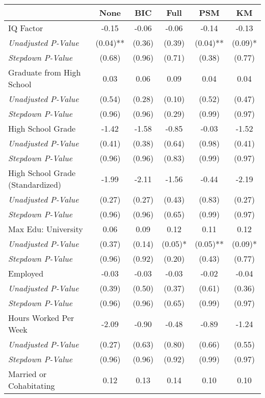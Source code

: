 \begin{tabular}{l c c c c c}
\toprule
 & None & BIC & Full & PSM & KM \\
\midrule
IQ Factor & -0.15 & -0.06 & -0.06 & -0.14 & -0.13 \\
\quad \textit{Unadjusted P-Value} & (0.04)** & (0.36) & (0.39) & (0.04)** & (0.09)* \\
\quad \textit{Stepdown P-Value} & (0.68) & (0.96) & (0.71) & (0.38) & (0.77) \\
Graduate from High School & 0.03 & 0.06 & 0.09 & 0.04 & 0.04 \\
\quad \textit{Unadjusted P-Value} & (0.54) & (0.28) & (0.10) & (0.52) & (0.47) \\
\quad \textit{Stepdown P-Value} & (0.96) & (0.96) & (0.29) & (0.99) & (0.97) \\
High School Grade & -1.42 & -1.58 & -0.85 & -0.03 & -1.52 \\
\quad \textit{Unadjusted P-Value} & (0.41) & (0.38) & (0.64) & (0.98) & (0.41) \\
\quad \textit{Stepdown P-Value} & (0.96) & (0.96) & (0.83) & (0.99) & (0.97) \\
High School Grade (Standardized) & -1.99 & -2.11 & -1.56 & -0.44 & -2.19 \\
\quad \textit{Unadjusted P-Value} & (0.27) & (0.27) & (0.43) & (0.83) & (0.27) \\
\quad \textit{Stepdown P-Value} & (0.96) & (0.96) & (0.65) & (0.99) & (0.97) \\
Max Edu: University & 0.06 & 0.09 & 0.12 & 0.11 & 0.12 \\
\quad \textit{Unadjusted P-Value} & (0.37) & (0.14) & (0.05)* & (0.05)** & (0.09)* \\
\quad \textit{Stepdown P-Value} & (0.96) & (0.92) & (0.20) & (0.43) & (0.77) \\
Employed & -0.03 & -0.03 & -0.03 & -0.02 & -0.04 \\
\quad \textit{Unadjusted P-Value} & (0.39) & (0.50) & (0.37) & (0.61) & (0.36) \\
\quad \textit{Stepdown P-Value} & (0.96) & (0.96) & (0.65) & (0.99) & (0.97) \\
Hours Worked Per Week & -2.09 & -0.90 & -0.48 & -0.89 & -1.24 \\
\quad \textit{Unadjusted P-Value} & (0.27) & (0.63) & (0.80) & (0.66) & (0.55) \\
\quad \textit{Stepdown P-Value} & (0.96) & (0.96) & (0.92) & (0.99) & (0.97) \\
Married or Cohabitating & 0.12 & 0.13 & 0.14 & 0.10 & 0.10 \\

\end{tabular}
